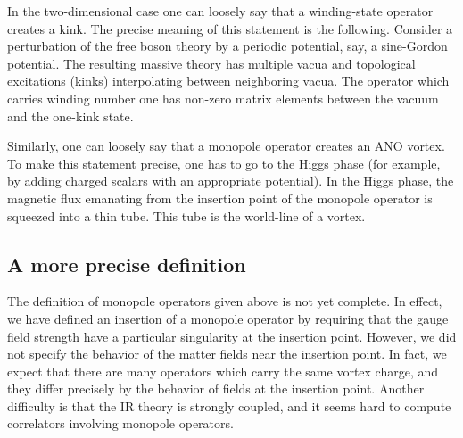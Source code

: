 \documentclass[a4paper,12pt, amsfonts, amssymb]{article}
\begin{document}
In the two-dimensional case one can loosely say that a winding-state
operator creates a kink. The precise meaning of this statement is the
following. Consider a perturbation of the free boson theory by
a periodic potential, say, a sine-Gordon potential. The resulting
massive theory has multiple vacua and topological excitations (kinks) interpolating between neighboring vacua. The operator which carries
winding number one has non-zero matrix elements between the vacuum
and the one-kink state.

Similarly, one can loosely say that a monopole operator creates
an ANO vortex. To make this statement precise, one
has to go to the Higgs phase (for example, by adding charged scalars
with an appropriate potential). In the Higgs phase, the magnetic
flux emanating from the insertion point of the monopole operator
is squeezed into a thin tube. This tube is the world-line of a vortex.

\subsection{A more precise definition}

The definition of monopole operators given above is not yet complete.
In effect, we have defined an insertion of a monopole operator by 
requiring that the gauge field strength have a particular singularity
at the insertion point. However, we did not specify the behavior
of the matter fields near the insertion point. In fact, we expect
that there are many operators which carry the same vortex charge, and
they differ precisely by the behavior of fields at the insertion point. 
Another difficulty is that the IR theory is strongly coupled, and it seems
hard to compute correlators involving monopole operators.
\end{document}
